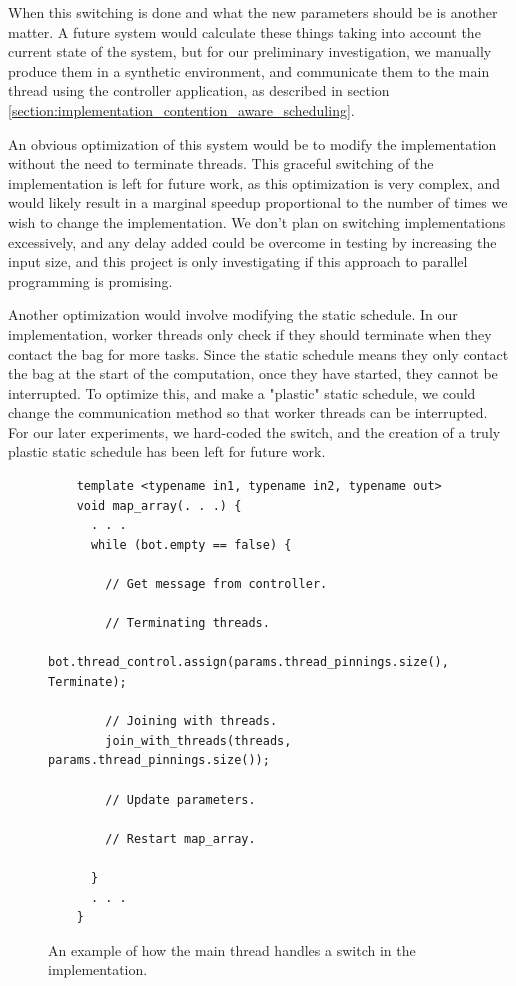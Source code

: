 When this switching is done and what the new parameters should be is another matter. A future system would calculate these things taking into account the current state of the system, but for our preliminary investigation, we manually produce them in a synthetic environment, and communicate them to the main thread using the controller application, as described in section \ref{section:implementation_contention_aware_scheduling}.

An obvious optimization of this system would be to modify the implementation without the need to terminate threads. This graceful switching of the implementation is left for future work, as this optimization is very complex, and would likely result in a marginal speedup proportional to the number of times we wish to change the implementation. We don't plan on switching implementations excessively, and any delay added could be overcome in testing by increasing the input size, and this project is only investigating if this approach to parallel programming is promising.

Another optimization would involve modifying the static schedule. In our implementation, worker threads only check if they should terminate when they contact the bag for more tasks. Since the static schedule means they only contact the bag at the start of the computation, once they have started, they cannot be interrupted. To optimize this, and make a "plastic" static schedule, we could change the communication method so that worker threads can be interrupted. For our later experiments, we hard-coded the switch, and the creation of a truly plastic static schedule has been left for future work.



\begin{figure}
	\begin{lstlisting}
	template <typename in1, typename in2, typename out>
	void map_array(. . .) {
	  . . .
	  while (bot.empty == false) {
  
	    // Get message from controller.
  
        // Terminating threads.
        bot.thread_control.assign(params.thread_pinnings.size(), Terminate);
  
        // Joining with threads.
        join_with_threads(threads, params.thread_pinnings.size());
  
        // Update parameters.
  
        // Restart map_array.
  	    
	  }
	  . . .
	}
	\end{lstlisting}

	\caption{An example of how the main thread handles a switch in the implementation.}
	\label{fig:implementation_main_thread_bot_comms}
\end{figure}



